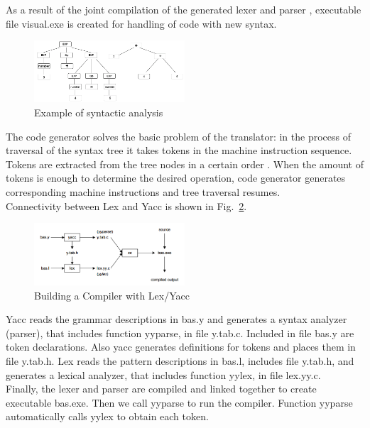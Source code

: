 \documentclass[a4paper, 10pt, conference]{ieeeconf}
\begin{document}
As a result of the joint compilation of the generated lexer and parser , executable file visual.exe is created for handling of code with new syntax.
\begin{figure}[h]
    \centering
    \includegraphics[width=0.5\textwidth]{parsetree.png}
    \caption{Example of syntactic analysis}
    \label{fig:parsetree}
\end{figure}
The code generator solves the basic problem of the translator: in the process of traversal of the syntax tree it takes tokens in the machine instruction sequence. Tokens are extracted from the tree nodes in a certain order . When the amount of tokens is enough to determine the desired operation, code generator generates corresponding machine instructions and tree traversal resumes.\\
Connectivity between Lex and Yacc is shown in Fig.~\ref{fig:generation}.\\
\begin{figure}[h]
    \centering
    \includegraphics[width=0.5\textwidth]{generation.png}
    \caption{Building a Compiler with Lex/Yacc}
    \label{fig:generation}
\end{figure}
Yacc reads the grammar descriptions in bas.y and generates a syntax analyzer (parser), that includes function yyparse, in file y.tab.c. Included in file bas.y are token declarations. Also yacc generates definitions for tokens and places them in file y.tab.h. Lex reads the pattern descriptions in bas.l, includes file y.tab.h, and generates a lexical analyzer, that includes function yylex, in file lex.yy.c.\\
Finally, the lexer and parser are compiled and linked together to create executable bas.exe. Then we call yyparse to run the compiler. Function yyparse automatically calls yylex to obtain each token.
\end{document}
